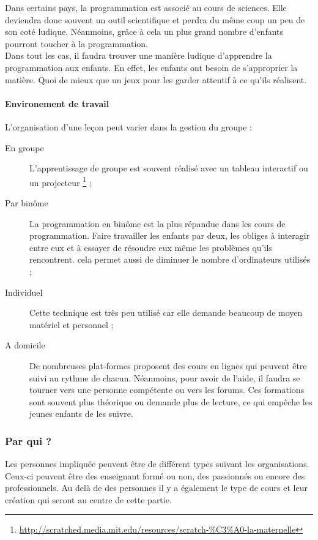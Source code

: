 Dans certains pays, la programmation est associé au cours de sciences. Elle deviendra donc souvent un outil scientifique et perdra du même coup un peu de son coté ludique. Néanmoins, grâce à cela un plus grand nombre d'enfants pourront toucher à la programmation.\\

Dans tout les cas, il faudra trouver une manière ludique d'apprendre la programmation aux enfants. En effet, les enfants ont besoin de s'approprier la matière. Quoi de mieux que un jeux pour les garder attentif à ce qu'ils réalisent.

\paragraph{Environement de travail}
L'organisation d'une leçon peut varier dans la gestion du groupe :
\begin{description}
  \item[En groupe] L'apprentissage de groupe est souvent réalisé avec un tableau interactif ou un projecteur \footnote{\url{http://scratched.media.mit.edu/resources/scratch-\%C3\%A0-la-maternelle}} ;
  \item[Par binôme] La programmation en binôme est la plus répandue dans les cours de programmation. Faire travailler les enfants par deux, les obliges à interagir entre eux et à essayer de résoudre eux même les problèmes qu'ils rencontrent. cela permet aussi de diminuer le nombre d'ordinateurs utilisés ;
  \item[Individuel] Cette technique est très peu utilisé car elle demande beaucoup de moyen matériel et personnel ;
  \item[A domicile] De nombreuses plat-formes proposent des cours en lignes qui peuvent être suivi au rythme de chacun. Néanmoins, pour avoir de l'aide, il faudra se tourner vers une personne compétente ou vers les forums. Ces formations sont souvent plus théorique ou demande plus de lecture, ce qui empêche les jeunes enfants de les suivre.
\end{description}

\subsubsection{Par qui ?}
Les personnes impliquée peuvent être de différent types suivant les organisations. Ceux-ci peuvent être des enseignant formé ou non, des passionnés ou encore des professionnels. Au delà de des personnes il y a également le type de cours et leur création qui seront au centre de cette partie.

